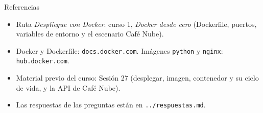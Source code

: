 \documentclass[aspectratio=169,10pt,c]{beamer}
\begin{document}
\begin{frame}{Referencias}
\scriptsize
\begin{itemize}\setlength\itemsep{4pt}
  \item Ruta \textit{Despliegue con Docker}: curso 1, \textit{Docker desde cero} (Dockerfile, puertos, variables de entorno y el escenario Café Nube).
  \item Docker y Dockerfile: \texttt{docs.docker.com}. Imágenes \texttt{python} y \texttt{nginx}: \texttt{hub.docker.com}.
  \item Material previo del curso: Sesión 27 (desplegar, imagen, contenedor y su ciclo de vida, y la API de Café Nube).
  \item Las respuestas de las preguntas están en \texttt{../respuestas.md}.
\end{itemize}
\end{frame}
\end{document}
